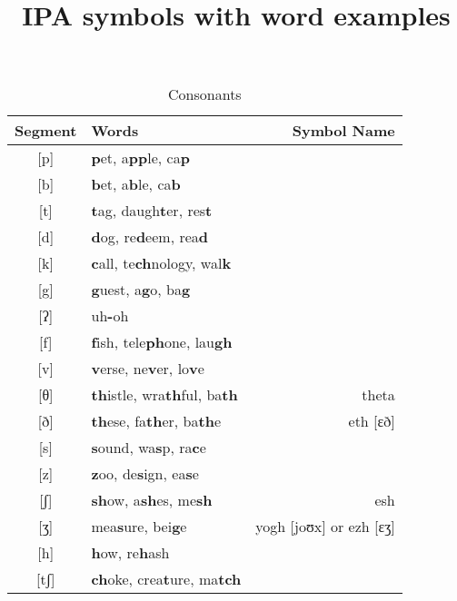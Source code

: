 \documentclass{article}
\title{IPA symbols with word examples}
\date{}
\begin{document}
  \maketitle

  

  \begin{table}[htb]
    \caption{Consonants}
    \centering
    \vspace{0.5cm}
    \begin{tabular}{c | l r}
      Segment & Words & Symbol Name \\
      \hline
      {[}p{]} & \textbf{p}et, a\textbf{pp}le, ca\textbf{p}          & \\
      {[}b{]}  & \textbf{b}et, a\textbf{b}le, ca\textbf{b}          & \\
      {[}t{]}  & \textbf{t}ag, daugh\textbf{t}er, res\textbf{t}     & \\
      {[}d{]}  & \textbf{d}og, re\textbf{d}eem, rea\textbf{d}       & \\
      {[}k{]}  & \textbf{c}all, te\textbf{ch}nology, wal\textbf{k}  & \\
      {[}g{]}  & \textbf{g}uest, a\textbf{g}o, ba\textbf{g}         & \\
      {[}ʔ{]}  & uh\textbf{-}oh                                     & \\
      {[}f{]}  & \textbf{f}ish, tele\textbf{ph}one, lau\textbf{gh}  & \\
      {[}v{]}  & \textbf{v}erse, ne\textbf{v}er, lo\textbf{v}e      & \\
      {[}θ{]}  & \textbf{th}istle, wra\textbf{th}ful, ba\textbf{th} & theta\\
      {[}ð{]}  & \textbf{th}ese, fa\textbf{th}er, ba\textbf{th}e    & eth {[}ɛð{]}\\
      {[}s{]}  & \textbf{s}ound, wa\textbf{s}p, ra\textbf{c}e       & \\
      {[}z{]}  & \textbf{z}oo, de\textbf{s}ign, ea\textbf{s}e       & \\
      {[}ʃ{]}  & \textbf{sh}ow, a\textbf{sh}es, me\textbf{sh}       & esh \\
      {[}ʒ{]}  & mea\textbf{s}ure, bei\textbf{g}e                   & yogh {[}joʊx{]} or ezh {[}ɛʒ{]}\\
      {[}h{]}  & \textbf{h}ow, re\textbf{h}ash                      & \\
      {[}tʃ{]} & \textbf{ch}oke, crea\textbf{t}ure, ma\textbf{tch}  & \\

\end{tabular}
\end{table}
\end{document}
